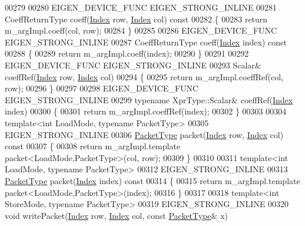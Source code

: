 \begin{DoxyCode}
00279 
00280   EIGEN\_DEVICE\_FUNC EIGEN\_STRONG\_INLINE
00281   CoeffReturnType coeff(\hyperlink{namespace_eigen_a62e77e0933482dafde8fe197d9a2cfde}{Index} row, \hyperlink{namespace_eigen_a62e77e0933482dafde8fe197d9a2cfde}{Index} col)\textcolor{keyword}{ const}
00282 \textcolor{keyword}{  }\{
00283     \textcolor{keywordflow}{return} m\_argImpl.coeff(col, row);
00284   \}
00285 
00286   EIGEN\_DEVICE\_FUNC EIGEN\_STRONG\_INLINE
00287   CoeffReturnType coeff(\hyperlink{namespace_eigen_a62e77e0933482dafde8fe197d9a2cfde}{Index} index)\textcolor{keyword}{ const}
00288 \textcolor{keyword}{  }\{
00289     \textcolor{keywordflow}{return} m\_argImpl.coeff(index);
00290   \}
00291 
00292   EIGEN\_DEVICE\_FUNC EIGEN\_STRONG\_INLINE
00293   Scalar& coeffRef(\hyperlink{namespace_eigen_a62e77e0933482dafde8fe197d9a2cfde}{Index} row, \hyperlink{namespace_eigen_a62e77e0933482dafde8fe197d9a2cfde}{Index} col)
00294   \{
00295     \textcolor{keywordflow}{return} m\_argImpl.coeffRef(col, row);
00296   \}
00297 
00298   EIGEN\_DEVICE\_FUNC EIGEN\_STRONG\_INLINE
00299   \textcolor{keyword}{typename} XprType::Scalar& coeffRef(\hyperlink{namespace_eigen_a62e77e0933482dafde8fe197d9a2cfde}{Index} index)
00300   \{
00301     \textcolor{keywordflow}{return} m\_argImpl.coeffRef(index);
00302   \}
00303 
00304   \textcolor{keyword}{template}<\textcolor{keywordtype}{int} LoadMode, \textcolor{keyword}{typename} PacketType>
00305   EIGEN\_STRONG\_INLINE
00306   \hyperlink{struct_eigen_1_1_packet_type}{PacketType} packet(\hyperlink{namespace_eigen_a62e77e0933482dafde8fe197d9a2cfde}{Index} row, \hyperlink{namespace_eigen_a62e77e0933482dafde8fe197d9a2cfde}{Index} col)\textcolor{keyword}{ const}
00307 \textcolor{keyword}{  }\{
00308     \textcolor{keywordflow}{return} m\_argImpl.template packet<LoadMode,PacketType>(col, row);
00309   \}
00310 
00311   \textcolor{keyword}{template}<\textcolor{keywordtype}{int} LoadMode, \textcolor{keyword}{typename} PacketType>
00312   EIGEN\_STRONG\_INLINE
00313   \hyperlink{struct_eigen_1_1_packet_type}{PacketType} packet(\hyperlink{namespace_eigen_a62e77e0933482dafde8fe197d9a2cfde}{Index} index)\textcolor{keyword}{ const}
00314 \textcolor{keyword}{  }\{
00315     \textcolor{keywordflow}{return} m\_argImpl.template packet<LoadMode,PacketType>(index);
00316   \}
00317 
00318   \textcolor{keyword}{template}<\textcolor{keywordtype}{int} StoreMode, \textcolor{keyword}{typename} PacketType>
00319   EIGEN\_STRONG\_INLINE
00320   \textcolor{keywordtype}{void} writePacket(\hyperlink{namespace_eigen_a62e77e0933482dafde8fe197d9a2cfde}{Index} row, \hyperlink{namespace_eigen_a62e77e0933482dafde8fe197d9a2cfde}{Index} col, \textcolor{keyword}{const} \hyperlink{struct_eigen_1_1_packet_type}{PacketType}& x)

\end{DoxyCode}
